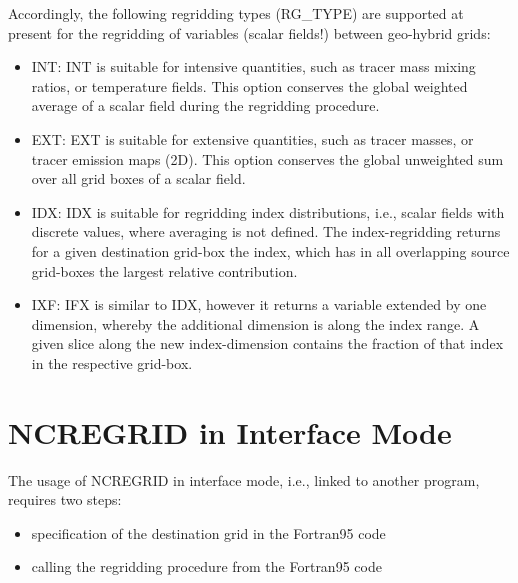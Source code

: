 \documentclass[12pt, a4paper]{article}
\begin{document}
Accordingly, the following regridding types (RG\_TYPE) are supported
at present
for the regridding of variables (scalar fields!) between geo-hybrid grids:
%
\begin{itemize}
\item INT: INT is suitable for intensive quantities, such as
           tracer mass mixing ratios, or temperature fields. This option
           conserves the global weighted average
           of a scalar field during the regridding procedure.
\item EXT: EXT is suitable for extensive quantities, such as
           tracer masses, or tracer emission maps (2D). This option 
           conserves the global unweighted sum over all grid boxes of a 
           scalar field.
\item IDX: IDX is suitable for regridding index distributions, i.e.,
           scalar fields with discrete values, where averaging is not
           defined. The index-regridding returns for a given
           destination grid-box the index, which has in all
           overlapping source grid-boxes the largest relative contribution.
\item IXF: IFX is similar to IDX, however it returns a variable extended by
           one dimension, whereby the additional dimension is along the
           index range.
           A given slice along the new index-dimension contains the
           fraction of that index in the respective grid-box.
\end{itemize}


\section{NCREGRID in Interface Mode}
\label{sec:interface}
The usage of NCREGRID in interface mode, i.e., linked to another program,
requires two steps:
\begin{itemize}
  \item specification of the destination grid in the Fortran95 code
  \item calling the regridding procedure from the Fortran95 code
\end{itemize}
\end{document}
